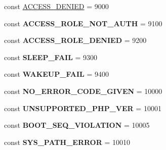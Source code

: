\begin{DoxyCompactItemize}
\item 
const \hyperlink{class_able_polecat___error_a58ceb882042acb8eea73d1c9a9b8feff}{A\+C\+C\+E\+S\+S\+\_\+\+D\+E\+N\+I\+E\+D} = 9000
\item 
\hypertarget{class_able_polecat___error_a22b386ac75aa2175c6976baa7441ff12}{}const {\bfseries A\+C\+C\+E\+S\+S\+\_\+\+R\+O\+L\+E\+\_\+\+N\+O\+T\+\_\+\+A\+U\+T\+H} = 9100\label{class_able_polecat___error_a22b386ac75aa2175c6976baa7441ff12}

\item 
\hypertarget{class_able_polecat___error_ad6b47c33c9f7b9da11ff613ba094240a}{}const {\bfseries A\+C\+C\+E\+S\+S\+\_\+\+R\+O\+L\+E\+\_\+\+D\+E\+N\+I\+E\+D} = 9200\label{class_able_polecat___error_ad6b47c33c9f7b9da11ff613ba094240a}

\item 
\hypertarget{class_able_polecat___error_a2d6eb638fe0a355fbfada25855f6eafa}{}const {\bfseries S\+L\+E\+E\+P\+\_\+\+F\+A\+I\+L} = 9300\label{class_able_polecat___error_a2d6eb638fe0a355fbfada25855f6eafa}

\item 
\hypertarget{class_able_polecat___error_a2a4681f11227726b60dc808599437162}{}const {\bfseries W\+A\+K\+E\+U\+P\+\_\+\+F\+A\+I\+L} = 9400\label{class_able_polecat___error_a2a4681f11227726b60dc808599437162}

\item 
\hypertarget{class_able_polecat___error_aac5739490a76894d3bb20cafc0bd8aed}{}const {\bfseries N\+O\+\_\+\+E\+R\+R\+O\+R\+\_\+\+C\+O\+D\+E\+\_\+\+G\+I\+V\+E\+N} = 10000\label{class_able_polecat___error_aac5739490a76894d3bb20cafc0bd8aed}

\item 
\hypertarget{class_able_polecat___error_a26f67522684ebe079e8adb8acb79dc0f}{}const {\bfseries U\+N\+S\+U\+P\+P\+O\+R\+T\+E\+D\+\_\+\+P\+H\+P\+\_\+\+V\+E\+R} = 10001\label{class_able_polecat___error_a26f67522684ebe079e8adb8acb79dc0f}

\item 
\hypertarget{class_able_polecat___error_a1c1fd49c7800a3efff529daa8b29ef28}{}const {\bfseries B\+O\+O\+T\+\_\+\+S\+E\+Q\+\_\+\+V\+I\+O\+L\+A\+T\+I\+O\+N} = 10005\label{class_able_polecat___error_a1c1fd49c7800a3efff529daa8b29ef28}

\item 
\hypertarget{class_able_polecat___error_af89bea91a30c5d2c6ddebf571d882261}{}const {\bfseries S\+Y\+S\+\_\+\+P\+A\+T\+H\+\_\+\+E\+R\+R\+O\+R} = 10010\label{class_able_polecat___error_af89bea91a30c5d2c6ddebf571d882261}


\end{DoxyCompactItemize}
